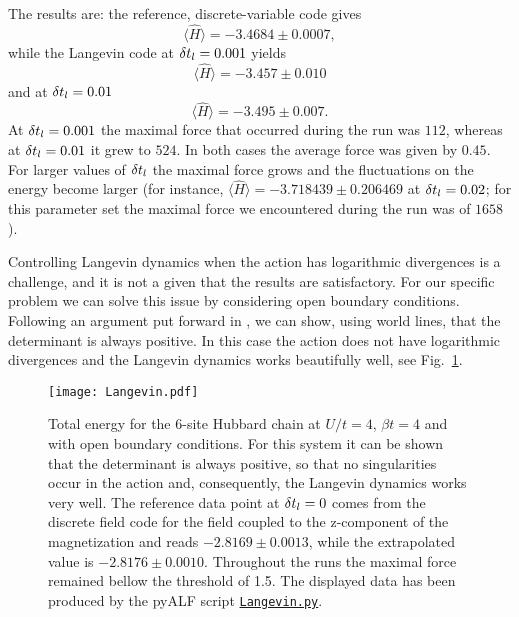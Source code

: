The results are: the reference, discrete-variable code gives
\begin{equation}
 \langle  \hat{H} \rangle  =  -3.4684 \pm 0.0007,
\end{equation} 
while the Langevin code at $ \delta t_{l} = 0.001$  yields 
\begin{equation}
 \langle  \hat{H} \rangle  =  -3.457 \pm 0.010 
\end{equation} 
and at $ \delta t_{l} = 0.01$
\begin{equation}
 \langle  \hat{H} \rangle  = -3.495 \pm 0.007\text{.}
\end{equation} 
 At $ \delta t_{l} = 0.001$   the maximal force that occurred during the run was 
$ 112$, whereas at $ \delta t_{l} = 0.01$ it grew to $524$.    In both cases the average force was given by $0.45$.   For larger values of  $ \delta t_{l} $ the maximal force grows and the fluctuations on the energy become  larger
(for instance, $ \langle  \hat{H} \rangle  =  -3.718439    \pm   0.206469 $  at $ \delta t_{l} = 0.02$; for this parameter set the maximal force we encountered during the run was of $1658$).

Controlling Langevin dynamics when the action has logarithmic divergences is a challenge, and it is not a given that the results are satisfactory.  For our specific problem we can solve this issue by considering open boundary conditions. Following an argument put forward in \cite{Assaad07}, we can show, using world lines, that the determinant is always positive.   In this case the  action does not  have logarithmic divergences and the Langevin dynamics works beautifully well, see Fig.~\ref{Langevin.fig}. 

\begin{figure}[H]
        \begin{center}
                \texttt{[image: Langevin.pdf]}
            \end{center}
        \caption{Total energy for the 6-site Hubbard chain at $U/t=4$, $\beta t = 4$ and with open boundary conditions. For this system it can be shown that the determinant is always positive, so that no singularities occur in the action and, consequently, the Langevin dynamics works very well.  The reference data point at $\delta t_{l} =0$ comes from the discrete field code for the field coupled to the z-component of the magnetization and reads $-2.8169 \pm 0.0013$, while the extrapolated value is $-2.8176 \pm 0.0010$. Throughout the runs the maximal force remained bellow the threshold of 1.5. The displayed data has been produced by the pyALF script 
         \href{https://git.physik.uni-wuerzburg.de/ALF/pyALF/-/blob/\pyALFbranch/Scripts/Langevin.py}{\texttt{Langevin.py}}. }\label{Langevin.fig}
\end{figure}


